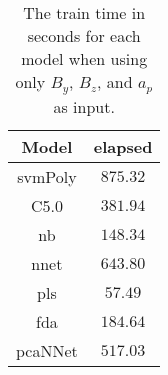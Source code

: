 \begin{table}[!ht]
	\centering
	\begin{tabular}{|c|c|}
		\hline
		Model & elapsed \\ \hline
		svmPoly & $875.32$ \\ \hline
		C5.0 & $381.94$ \\ \hline
		nb & $148.34$ \\ \hline
		nnet & $643.80$ \\ \hline
		pls & $57.49$ \\ \hline
		fda & $184.64$ \\ \hline
		pcaNNet & $517.03$ \\ \hline
	\end{tabular}
	\caption{The train time in seconds for each model when using only $B_{y}$, $B_{z}$, and $a_{p}$ as input.}
	\label{tab:time:yzap:train}
\end{table}
